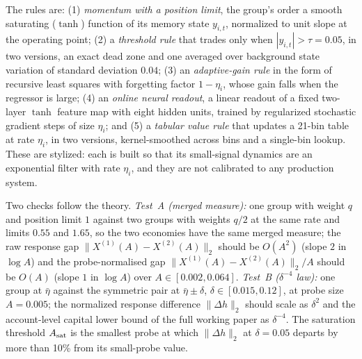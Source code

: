 \documentclass[12pt]{article}
\theoremstyle{definition}
\theoremstyle{remark}
\begin{document}
The rules are: (1) \emph{momentum with a position limit}, the group's order a smooth saturating ($\tanh$) function of its memory state $y_{i,t}$, normalized to unit slope at the operating point; (2) a \emph{threshold rule} that trades only when $|y_{i,t}|>\tau=0.05$, in two versions, an exact dead zone and one averaged over background state variation of standard deviation $0.04$; (3) an \emph{adaptive-gain rule} in the form of recursive least squares with forgetting factor $1-\eta_i$, whose gain falls when the regressor is large; (4) an \emph{online neural readout}, a linear readout of a fixed two-layer $\tanh$ feature map with eight hidden units, trained by regularized stochastic gradient steps of size $\eta_i$; and (5) a \emph{tabular value rule} that updates a 21-bin table at rate $\eta_i$, in two versions, kernel-smoothed across bins and a single-bin lookup. These are stylized: each is built so that its small-signal dynamics are an exponential filter with rate $\eta_i$, and they are not calibrated to any production system.

Two checks follow the theory. \emph{Test~A (merged measure):} one group with weight $q$ and position limit $1$ against two groups with weights $q/2$ at the same rate and limits $0.55$ and $1.65$, so the two economies have the same merged measure; the raw response gap $\|X^{(1)}(A)-X^{(2)}(A)\|_2$ should be $O(A^2)$ (slope $2$ in $\log A$) and the probe-normalised gap $\|X^{(1)}(A)-X^{(2)}(A)\|_2/A$ should be $O(A)$ (slope $1$ in $\log A$) over $A\in[0.002,0.064]$. \emph{Test~B ($\delta^{-4}$ law):} one group at $\bar\eta$ against the symmetric pair at $\bar\eta\pm\delta$, $\delta\in[0.015,0.12]$, at probe size $A=0.005$; the normalized response difference $\|\Delta h\|_2$ should scale as $\delta^2$ and the account-level capital lower bound of the full working paper as $\delta^{-4}$. The saturation threshold $A_{\rm sat}$ is the smallest probe at which $\|\Delta h\|_2$ at $\delta=0.05$ departs by more than 10\% from its small-probe value.
\end{document}
